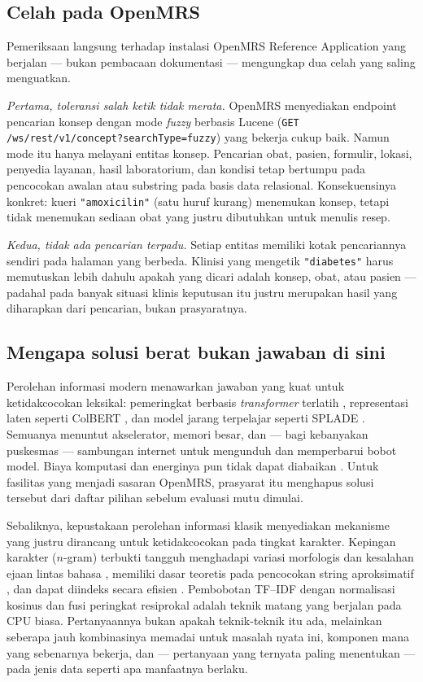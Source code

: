 \documentclass[journal,twoside,web]{ieeecolor}
\begin{document}
\subsection{Celah pada OpenMRS}

Pemeriksaan langsung terhadap instalasi OpenMRS Reference Application yang
berjalan --- bukan pembacaan dokumentasi --- mengungkap dua celah yang saling
menguatkan.

\emph{Pertama, toleransi salah ketik tidak merata.} OpenMRS menyediakan endpoint
pencarian konsep dengan mode \emph{fuzzy} berbasis Lucene
(\texttt{GET /ws/rest/v1/concept?searchType=fuzzy}) yang bekerja cukup baik. Namun
mode itu hanya melayani entitas konsep. Pencarian obat, pasien, formulir, lokasi,
penyedia layanan, hasil laboratorium, dan kondisi tetap bertumpu pada pencocokan
awalan atau substring pada basis data relasional. Konsekuensinya konkret: kueri
\texttt{"amoxicilin"} (satu huruf kurang) menemukan konsep, tetapi tidak
menemukan sediaan obat yang justru dibutuhkan untuk menulis resep.

\emph{Kedua, tidak ada pencarian terpadu.} Setiap entitas memiliki kotak
pencariannya sendiri pada halaman yang berbeda. Klinisi yang mengetik
\texttt{"diabetes"} harus memutuskan lebih dahulu apakah yang dicari adalah
konsep, obat, atau pasien --- padahal pada banyak situasi klinis keputusan itu
justru merupakan hasil yang diharapkan dari pencarian, bukan prasyaratnya.

\subsection{Mengapa solusi berat bukan jawaban di sini}

Perolehan informasi modern menawarkan jawaban yang kuat untuk ketidakcocokan
leksikal: pemeringkat berbasis \emph{transformer} terlatih \cite{lin2022},
representasi laten seperti ColBERT \cite{khattab2020}, dan model jarang terpelajar
seperti SPLADE \cite{formal2021}. Semuanya menuntut akselerator, memori besar,
dan --- bagi kebanyakan puskesmas --- sambungan internet untuk mengunduh dan
memperbarui bobot model. Biaya komputasi dan energinya pun tidak dapat diabaikan
\cite{strubell2019}. Untuk fasilitas yang menjadi sasaran OpenMRS, prasyarat itu
menghapus solusi tersebut dari daftar pilihan sebelum evaluasi mutu dimulai.

Sebaliknya, kepustakaan perolehan informasi klasik menyediakan mekanisme yang
justru dirancang untuk ketidakcocokan pada tingkat karakter. Kepingan karakter
($n$-gram) terbukti tangguh menghadapi variasi morfologis dan kesalahan ejaan
lintas bahasa \cite{mcnamee2004}, memiliki dasar teoretis pada pencocokan string
aproksimatif \cite{ukkonen1992, kondrak2005}, dan dapat diindeks secara efisien
\cite{boytsov2011}. Pembobotan TF--IDF dengan normalisasi kosinus
\cite{salton1975, salton1988, sparckjones1972, robertson2004} dan fusi peringkat
resiprokal \cite{cormack2009} adalah teknik matang yang berjalan pada CPU biasa.
Pertanyaannya bukan apakah teknik-teknik itu ada, melainkan seberapa jauh
kombinasinya memadai untuk masalah nyata ini, komponen mana yang sebenarnya
bekerja, dan --- pertanyaan yang ternyata paling menentukan --- pada jenis data
seperti apa manfaatnya berlaku.
\end{document}
